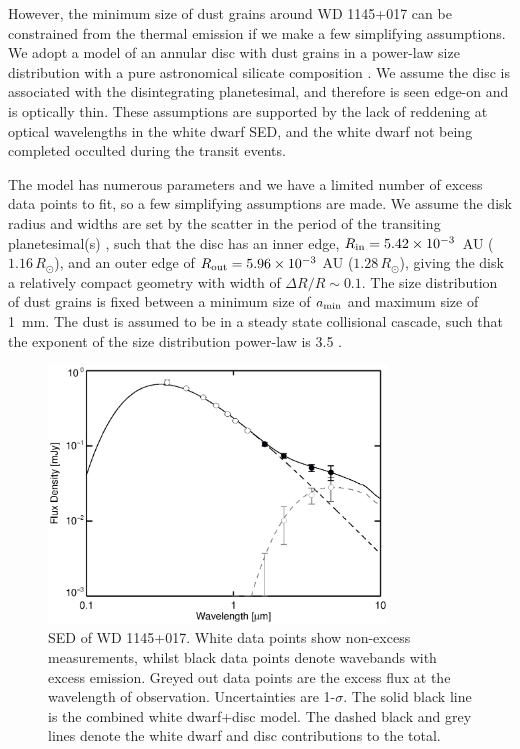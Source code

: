 \documentclass[useAMS,usenatbib]{mn2e}
\begin{document}
However, the minimum size of dust grains around WD 1145+017 can be constrained from the thermal emission if we make a few simplifying assumptions. We adopt a model of an annular disc with dust grains in a power-law size distribution with a pure astronomical silicate composition \citep{2003ARA&A..41..241D}. We assume the disc is associated with the disintegrating planetesimal, and therefore is seen edge-on and is optically thin. These assumptions are supported by the lack of reddening at optical wavelengths in the white dwarf SED, and the white dwarf not being completed occulted during the transit events.

The model has numerous parameters and we have a limited number of excess data points to fit, so a few simplifying assumptions are made. We assume the disk radius and widths are set by the scatter in the period of the transiting planetesimal(s) \citep[4.5--4.9 hrs,][]{2015Natur.526..546V}, such that the disc has an inner edge, $R_{\rm in}=5.42\times10^{-3}$~AU ($1.16\,R_\odot$), and an outer edge of $R_{\rm out} = 5.96\times10^{-3}~$AU ($1.28\,R_\odot$), giving the disk a relatively compact geometry with width of $\Delta R/R \sim 0.1$. The size distribution of dust grains is fixed between a minimum size of $a_{\rm min}$ and maximum size of 1~mm. The dust is assumed to be in a steady state collisional cascade, such that the exponent of the size distribution power-law is 3.5 \citep{1969JGR....74.2531D}. 

\begin{figure}
    \centering
    \includegraphics[width=9cm]{plots/wd1145p017_sed_astrosil.eps}
    \caption{SED of WD 1145+017. White data points show non-excess measurements, whilst black data points denote wavebands with excess emission. Greyed out data points are the excess flux at the wavelength of observation. Uncertainties are 1-$\sigma$. The solid black line is the combined white dwarf+disc model. The dashed black and grey lines denote the white dwarf and disc contributions to the total. \label{fig:wd1145p017_sed}}
\end{figure}
\end{document}
